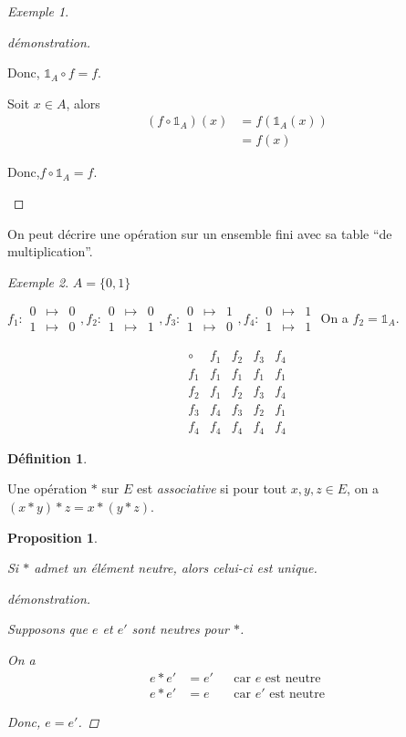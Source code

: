 \documentclass{report}
\newtheorem*{prop}{Proposition}
\theoremstyle{definition}
\newtheorem*{defin}{D\'efinition}
\theoremstyle{remark}
\newtheorem*{exem}{Exemple}
\begin{document}
\begin{exem}
\begin{ulist}
\begin{proof}[d\'emonstration]
\begin{nlist}
					Donc, $\mathds{1}_A \circ f=f$.
					\item Soit $x \in A$, alors
					\begin{align*}
						(f \circ \mathds{1}_A)(x)&= f(\mathds{1}_A(x))\\
						&=f(x)
					\end{align*}

					Donc,$f \circ \mathds{1}_A=f$.
				\end{nlist}
			\end{proof}
		\end{ulist}
	\end{exem}

	On peut d\'ecrire une op\'eration sur un ensemble fini avec sa table ``de multiplication''.
	\begin{exem}
		$A=\{0,1\}$

		$f_1:\begin{array}{rcl}
			0&\mapsto&0\\
			1&\mapsto&0
		\end{array},f_2:\begin{array}{rcl}
			0&\mapsto&0\\
			1&\mapsto&1
		\end{array},f_3:\begin{array}{rcl}
			0&\mapsto&1\\
			1&\mapsto&0
		\end{array},f_4:\begin{array}{rcl}
			0&\mapsto&1\\
			1&\mapsto&1
		\end{array}$
		On a $f_2=\mathds{1}_A$.

		\[
		\begin{array}{c||c|c|c|c}
			\circ&f_1&f_2&f_3&f_4\\
			\hline\hline
			f_1&f_1&f_1&f_1&f_1\\
			\hline
			f_2&f_1&f_2&f_3&f_4\\
			\hline
			f_3&f_4&f_3&f_2&f_1\\
			\hline
			f_4&f_4&f_4&f_4&f_4
		\end{array}
		\]
	\end{exem}
	\begin{defin}
		~

		Une op\'eration $*$ sur $E$ est \emph{associative} si pour tout $x,y,z \in E$, on a $(x*y)*z=x*(y*z)$.
	\end{defin}
	\begin{prop}
		~

		Si $*$ admet un \'el\'ement neutre, alors celui-ci est \emph{unique}.
		\begin{proof}[d\'emonstration]~

			Supposons que $e$ et $e'$ sont neutres pour $*$.

			On a
			\begin{align*}
				e*e'&=e'&&\text{car $e$ est neutre}\\
				e*e'&=e&&\text{car $e'$ est neutre}
			\end{align*}

			Donc, $e=e'$.
		\end{proof}
	\end{prop}
\end{document}
